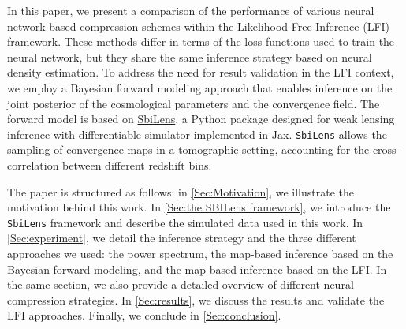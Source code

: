 \documentclass{aa}
\begin{document}
In this paper, we present a comparison of the performance of various neural network-based compression schemes within the Likelihood-Free Inference (LFI) framework. These methods differ in terms of the loss functions used to train the neural network, but they share the same inference strategy based on neural density estimation. To address the need for result validation in the LFI context, we employ a Bayesian forward modeling approach that enables inference on the joint posterior of the cosmological parameters and the convergence field. The forward model is based on \href{https://github.com/DifferentiableUniverseInitiative/sbi_lens}{\url{SbiLens}}, a Python package designed for weak lensing inference with differentiable simulator implemented in Jax. \texttt{SbiLens} allows the sampling of convergence maps in a tomographic setting, accounting for the cross-correlation between different redshift bins.



The paper is structured as follows: in \autoref{Sec:Motivation}, we illustrate the motivation behind this work. In \autoref{Sec:the SBILens framework}, we introduce the \texttt{SbiLens} framework and describe the simulated data used in this work. In \autoref{Sec:experiment}, we detail the inference strategy and the three different approaches we used: the power spectrum, the map-based inference based on the Bayesian forward-modeling, and the map-based inference based on the LFI. In the same section, we also provide a detailed overview of different neural compression strategies. In \autoref{Sec:results}, we discuss the results and validate the LFI approaches. Finally, we conclude in \autoref{Sec:conclusion}. 
\end{document}
